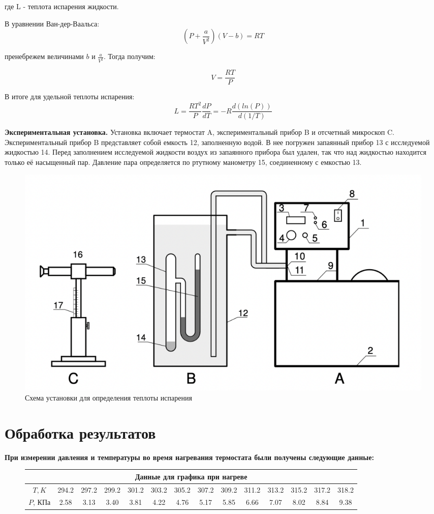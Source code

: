 \documentclass[a4paper,10pt]{article} %
\begin{document}
где L - теплота испарения жидкости.

В уравнении Ван-дер-Ваальса:
\[(P+\frac{a}{V^2})(V-b) = RT\]

пренебрежем величинами $b$ и $\frac{a}{V^2}$. Тогда получим:

\[ V = \frac{RT}{P} \]

В итоге для удельной теплоты испарения: 
\[L = \frac{RT^2}{P}\frac{dP}{dT} = -R\frac{d(ln(P))}{d(1/T)}\]
\medskip

\textbf{Экспериментальная установка.}
Установка включает термостат A, экспериментальный прибор B и отсчетный микроскоп C. Экспериментальный прибор B 
представляет собой емкость 12, заполненную водой. В нее погружен запаянный прибор 13 с исследуемой жидкостью 14. 
Перед заполнением исследуемой жидкости воздух из запаянного прибора был удален, так что над жидкостью находится 
только её насыщенный пар. Давление пара определяется по ртутному манометру 15, соединенному с емкостью 13.

\begin{figure}[H]
	\centering
	\includegraphics[scale=0.8]{Picture1}
	\caption{Схема установки для определения теплоты испарения}
\end{figure}

	
\section {Обработка результатов}
\textbf{При измерении давления и температуры во время нагревания термостата были получены следующие данные:}

\begin{figure}[H]
\begin{tabular}{|c|c|c|c|c|c|c|c|c|c|c|c|c|c|}
\hline
\multicolumn{14}{|c|}{Данные для графика при нагреве}\\
\hline
$T, K$&294.2&297.2&299.2&301.2&303.2&305.2&307.2&309.2&311.2&313.2&315.2&317.2&318.2\\\hline
$P$, КПа&2.58&3.13&3.40&3.81&4.22&4.76&5.17&5.85&6.66&7.07&8.02&8.84&9.38\\\hline
\end{tabular}
\end{figure}
\end{document}
